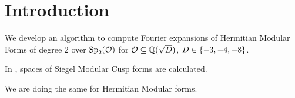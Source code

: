 
\section{Introduction}

We develop an algorithm to compute Fourier expansions of Hermitian Modular Forms of degree 2 over $\operatorname{Sp}_2(\mathcal{O})$ for $\mathcal{O} \subseteq \mathbb{Q}(\sqrt{D})$, $D \in \Set{-3,-4,-8}$.

In \cite{PoorYuen07Comp}, spaces of Siegel Modular Cusp forms are calculated.

We are doing the same for Hermitian Modular forms.





